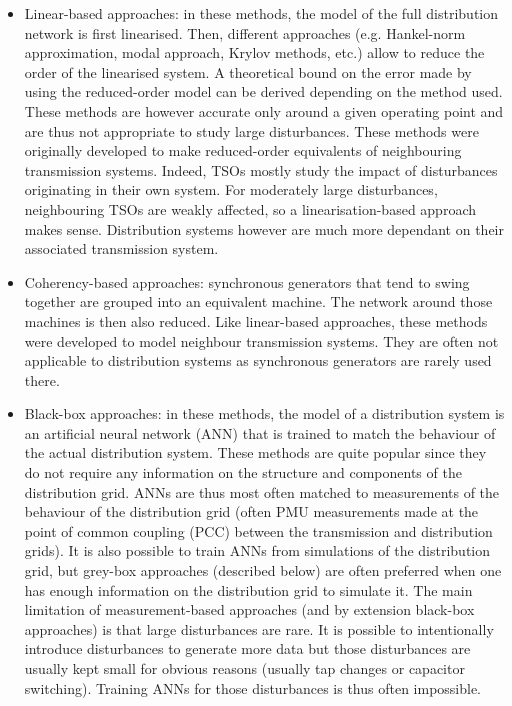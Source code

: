 \begin{itemize}
    \item Linear-based approaches: in these methods, the model of the full distribution network is first linearised. Then, different approaches (e.g. Hankel-norm approximation, modal approach, Krylov methods, etc.) allow to reduce the order of the linearised system. A theoretical bound on the error made by using the reduced-order model can be derived depending on the method used. These methods are however accurate only around a given operating point and are thus not appropriate to study large disturbances. These methods were originally developed to make reduced-order equivalents of neighbouring transmission systems. Indeed, TSOs mostly study the impact of disturbances originating in their own system. For moderately large disturbances, neighbouring TSOs are weakly affected, so a linearisation-based approach makes sense. Distribution systems however are much more dependant on their associated transmission system.
    \item Coherency-based approaches: synchronous generators that tend to swing together are grouped into an equivalent machine. The network around those machines is then also reduced. Like linear-based approaches, these methods were developed to model neighbour transmission systems. They are often not applicable to distribution systems as synchronous generators are rarely used there.
    \item Black-box approaches: in these methods, the model of a distribution system is an artificial neural network (ANN) that is trained to match the behaviour of the actual distribution system. These methods are quite popular since they do not require any information on the structure and components of the distribution grid. ANNs are thus most often matched to measurements of the behaviour of the distribution grid (often PMU measurements made at the point of common coupling (PCC) between the transmission and distribution grids). It is also possible to train ANNs from simulations of the distribution grid, but grey-box approaches (described below) are often preferred when one has enough information on the distribution grid to simulate it. The main limitation of measurement-based approaches (and by extension black-box approaches) is that large disturbances are rare. It is possible to intentionally introduce disturbances to generate more data but those disturbances are usually kept small for obvious reasons (usually tap changes or capacitor switching). Training ANNs for those disturbances is thus often impossible.

\end{itemize}
